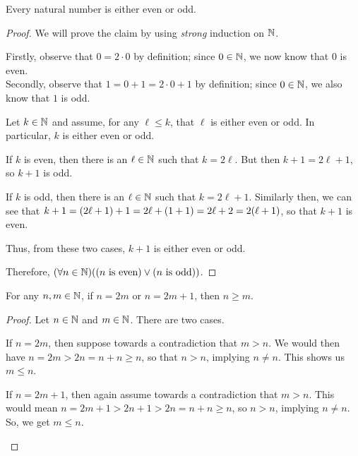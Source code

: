 \begin{example}
    Every natural number is either even or odd.
\end{example}
\begin{proof}
    We will prove the claim by using \emph{strong} induction on $\mathbb{N}$.
    \begin{case}
        Firstly, observe that $0 = 2 \cdot 0$ by definition;
        since $0 \in \mathbb{N}$, we now know that $0$ is even.\\
        Secondly, observe that $1 = 0 + 1 = 2 \cdot 0 + 1$ by definition;
        since $0 \in \mathbb{N}$, we also know that $1$ is odd.
    \end{case}
    \begin{case}
        Let $k \in \mathbb{N}$ and assume, for any $\ell \leq k$, that $\ell$ is either even or odd.
        In particular, $k$ is either even or odd.
        \begin{case}[Case 1]
            If $k$ is even, then there is an $\ell \in \mathbb{N}$ such that $k = 2\ell$.
            But then $k + 1 = 2\ell + 1$, so $k + 1$ is odd.
        \end{case}
        \begin{case}[Case 2]
            If $k$ is odd, then there is an $\ell \in \mathbb{N}$ such that $k = 2\ell + 1$.
            Similarly then,
            we can see that $k + 1 = \pn*{2\ell + 1} + 1 = 2\ell + \pn*{1 + 1} = 2\ell + 2 = 2\pn*{\ell + 1}$,
            so that $k + 1$ is even.
        \end{case}
        Thus, from these two cases, $k + 1$ is either even or odd.
    \end{case}
    Therefore, $\pn*{\forall n \in \N}\pn*{\pn*{n \text{ is even}} \join \pn*{n \text{ is odd}}}$.
\end{proof}

\begin{lemma}\label{lem:order}
    For any $n, m \in \mathbb{N}$, if $n = 2m$ or $n = 2m + 1$, then $n \geq m$.
\end{lemma}
\begin{proof}
    Let $n \in \mathbb{N}$ and $m \in \mathbb{N}$.
    There are two cases.
    \begin{case}[Case 1]
        If $n = 2m$, then
        suppose towards a contradiction that $m > n$.
        We would then have $n = 2m > 2n = n + n \geq n$,
        so that $n > n$, implying $n \neq n$. \contradiction
        This shows us $m \leq n$.
    \end{case}
    \begin{case}[Case 2]
        If $n = 2m + 1$, then
        again assume towards a contradiction that $m > n$.
        This would mean $n = 2m + 1 > 2n + 1 > 2n = n + n \geq n$,
        so $n > n$, implying $n \neq n$. \contradiction
        So, we get $m \leq n$.
    \end{case}
\end{proof}

